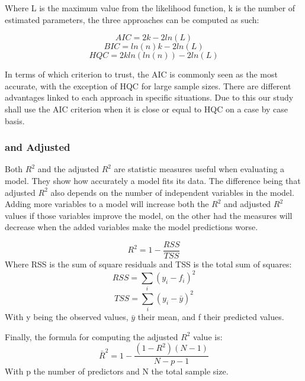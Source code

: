 Where L is the maximum value from the likelihood function, k is the number of estimated parameters, the three approaches can be computed as such:

\begin{equation}
    AIC = 2k - 2ln(L)
\end{equation}
\begin{equation}
    BIC = ln(n)k - 2ln(L)
\end{equation}
\begin{equation}
    HQC = 2kln(ln(n)) - 2ln(L)
\end{equation}


In terms of which criterion to trust, the AIC is commonly seen as the most accurate, with the exception of HQC for large sample sizes. There are different advantages linked to each approach in specific situations. Due to this our study shall use the AIC criterion when it is close or equal to HQC on a case by case basis.

\subsubsection{ and Adjusted }

Both $R^2$ and the adjusted $R^2$ are statistic measures useful when evaluating a model. They show how accurately a model fits its data. The difference being that adjusted $R^2$ also depends on the number of independent variables in the model. Adding more variables to a model will increase both the $R^2$ and adjusted $R^2$ values if those variables improve the model, on the other had the measures will decrease when the added variables make the model predictions worse.

\begin{equation}
    R^2 = 1 - \frac{RSS}{TSS}
\end{equation}
Where RSS is the sum of square residuals and TSS is the total sum of squares:
\begin{equation*}
    RSS = \sum_{i} (y_{i} - f_{i})^2
\end{equation*}
\begin{equation*}
    TSS = \sum_{i}(y_{i} - \bar{y})^{2}
\end{equation*}
With y being the observed values, $\bar{y}$ their mean, and f their predicted values.

Finally, the formula for computing the adjusted $R^2$ value is:
\begin{equation}
    \bar{R}^{2} = 1 - \frac{(1 - R^2)(N - 1)}{N - p - 1}
\end{equation}
With p the number of predictors and N the total sample size.

